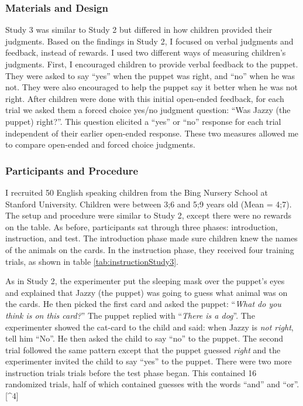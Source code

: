 \documentclass[oneside]{report}
\theoremstyle{definition}
\theoremstyle{definition}
\theoremstyle{definition}
\theoremstyle{remark}
\begin{document}
\subsubsection{Materials and Design}\label{materials-and-design-2}

Study 3 was similar to Study 2 but differed in how children provided
their judgments. Based on the findings in Study 2, I focused on verbal
judgments and feedback, instead of rewards. I used two different ways of
measuring children's judgments. First, I encouraged children to provide
verbal feedback to the puppet. They were asked to say ``yes'' when the
puppet was right, and ``no'' when he was not. They were also encouraged
to help the puppet say it better when he was not right. After children
were done with this initial open-ended feedback, for each trial we asked
them a forced choice yes/no judgment question: ``Was Jazzy (the puppet)
right?''. This question elicited a ``yes'' or ``no'' response for each
trial independent of their earlier open-ended response. These two
measures allowed me to compare open-ended and forced choice judgments.

\subsubsection{Participants and
Procedure}\label{participants-and-procedure-2}

I recruited 50 English speaking children from the Bing Nursery School at
Stanford University. Children were between 3;6 and 5;9 years old (Mean =
4;7). The setup and procedure were similar to Study 2, except there were
no rewards on the table. As before, participants sat through three
phases: introduction, instruction, and test. The introduction phase made
sure children knew the names of the animals on the cards. In the
instruction phase, they received four training trials, as shown in table
\ref{tab:instructionStudy3}.

As in Study 2, the experimenter put the sleeping mask over the puppet's
eyes and explained that Jazzy (the puppet) was going to guess what
animal was on the cards. He then picked the first card and asked the
puppet: ``\emph{What do you think is on this card?}'' The puppet replied
with ``\emph{There is a dog}''. The experimenter showed the cat-card to
the child and said: when Jazzy is \emph{not right}, tell him ``No''. He
then asked the child to say ``no'' to the puppet. The second trial
followed the same pattern except that the puppet guessed \emph{right}
and the experimenter invited the child to say ``yes'' to the puppet.
There were two more instruction trials trials before the test phase
began. This contained 16 randomized trials, half of which contained
guesses with the words ``and'' and ``or''.{[}\^{}4{]}
\end{document}
